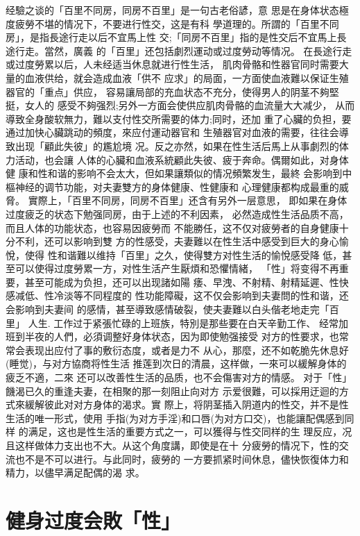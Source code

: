 \documentclass[12pt,UTF8]{ctexbook}
\begin{document}
经驗之谈的「百里不同房，同房不百里」是一句古老俗諺，意
思是在身体状态極度疲勞不堪的情况下，不要进行性交，这是有科
學道理的。所謂的「百里不同房」，是指長途行走以后不宜馬上性
交;「同房不百里」指的是性交后不宜馬上長途行走。當然，廣義
的「百里」还包括劇烈運动或过度勞动等情况。
在長途行走或过度勞累以后，人未经适当休息就进行性生活，
肌肉骨骼和性器官同时需要大量的血液供给，就会造成血液「供不
应求」的局面，一方面使血液難以保证生殖器官的「重点」供应，
容易讓局部的充血状态不充分，使得男人的阴茎不夠堅挺，女人的
感受不夠强烈;另外一方面会使供应肌肉骨骼的血流量大大减少，
从而導致全身酸软無力，難以支付性交所需要的体力;同时，还加
重了心臟的负担，要通过加快心臟跳动的頻度，來应付運动器官和
生殖器官对血液的需要，往往会導致出现「顧此失彼」的尷尬境
况。反之亦然，如果在性生活后馬上从事劇烈的体力活动，也会讓
人体的心臟和血液系統顧此失彼、疲于奔命。偶爾如此，对身体健
康和性和谐的影响不会太大，但如果讓類似的情况頻繁发生，最終
会影响到中樞神经的调节功能，对夫妻雙方的身体健康、性健康和
心理健康都构成最重的威脅。
實際上，「百里不同房，同房不百里」还含有另外一层意思，
即如果在身体过度疲乏的状态下勉强同房，由于上述的不利因素，
必然造成性生活品质不高，而且人体的功能状态，也容易因疲勞而
不能勝任，这不仅对疲勞者的自身健康十分不利，还可以影响到雙
方的性感受，夫妻難以在性生活中感受到巨大的身心愉悅，使得
性和谐難以维持「百里」之久，使得雙方对性生活的愉悅感受降
低，甚至可以使得过度勞累一方，对性生活产生厭煩和恐懼情緒，
「性」将变得不再重要，甚至可能成为负担，还可以出现諸如陽
痿、早洩、不射精、射精延遲、性快感减低、性冷淡等不同程度的
性功能障礙，这不仅会影响到夫妻問的性和谐，还会影响到夫妻间
的感情，甚至導致感情破裂，使夫妻難以白头偕老地走完「百里」
人生.
工作过于紧張忙碌的上班族，特別是那些要在白天辛勤工作、
经常加班到半夜的人們，必須调整好身体状态，因为即使勉强接受
对方的性要求，也常常会表现出应付了事的敷衍态度，或者是力不
从心，那麼，还不如乾脆先休息好(睡觉)，与对方協商将性生活
推莲到次日的清晨，这样做，一來可以緩解身体的疲乏不適，二來
还可以改善性生活的品质，也不会傷害对方的情感。
对于「性」饑渴已久的重逢夫妻，在相聚的那一刻阻止向对方
示爱很難，可以採用迂迴的方式來緩解彼此对对方身体的渴求。實
際上，将阴茎插入阴道内的性交，并不是性生活的唯一形式，使用
手指(为对方手淫)和口唇(为对方口交)，也能讓配偶感到同样
的满足，这也是性生活的重要方式之一，可以獲得与性交同样的生
理反应，况且这样做体力支出也不大。从这个角度講，即使是在十
分疲勞的情况下，性的交流也不是不可以进行。与此同时，疲勞的
一方要抓紧时间休息，儘快恢復体力和精力，以儘早满足配偶的渴
求。

\section{健身过度会敗「性」}
\end{document}
